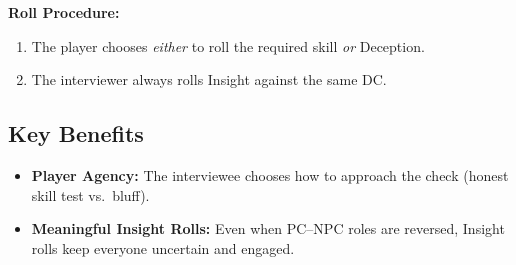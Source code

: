 \documentclass[twocolumn]{dndbook}
\begin{document}


\noindent\textbf{Roll Procedure:}
\begin{enumerate}
  \item The player chooses \emph{either} to roll the required skill \emph{or} Deception.
  \item The interviewer always rolls Insight against the same DC.
\end{enumerate}

\subsection{Key Benefits}
\begin{itemize}
  \item \textbf{Player Agency:} The interviewee chooses how to approach the check (honest skill test vs.\ bluff).
  \item \textbf{Meaningful Insight Rolls:} Even when PC–NPC roles are reversed, Insight rolls keep everyone uncertain and engaged.
\end{itemize}
\end{document}
